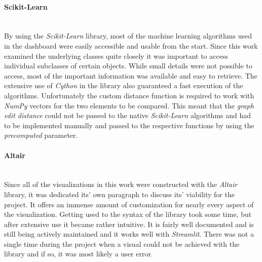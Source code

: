 \documentclass[a4paper, 12pt]{article}
\begin{document}
\paragraph{Scikit-Learn}\mbox{}\\
By using the \textit{Scikit-Learn} library, most of the machine learning algorithms used in the dashboard
were easily accessible and usable from the start. Since this work examined the underlying classes quite
closely it was important to access individual subclasses of certain objects. While small details were not
possible to access, most of the important information was available and easy to retrieve. The extensive use
of \textit{Cython} in the library also guaranteed a fast execution of the algorithms. Unfortunately the
custom distance function is required to work with \textit{NumPy} vectors for the two elements to be compared.
This meant that the \textit{graph edit distance} could not be passed to the native \textit{Scikit-Learn}
algorithms and had to be implemented manually and passed to the respective functions by using the
\textit{precomputed} parameter. \par

\paragraph{Altair}\mbox{}\\
Since all of the visualizations in this work were constructed with the \textit{Altair} library, it was
dedicated its' own paragraph to discuss its' viability for the project. It offers an immense amount of
customization for nearly every aspect of the visualization. Getting used to the syntax of the library
took some time, but after extensive use it became rather intuitive. It is fairly well documented and
is still being actively maintained and it works well with \textit{Streamlit}. There was not a single
time during the project when a visual could not be achieved with the library and if so, it was most likely
a user error. \par
\end{document}
